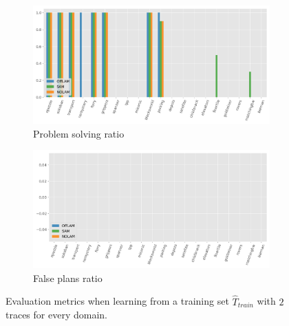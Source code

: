 \begin{figure}[ht]
  \begin{subfigure}[b]{0.45\textwidth}
    \includegraphics[width=\textwidth]{figures/2_traces/solving.png}
    \caption{Problem solving ratio}
  \end{subfigure}
  \hfill
  \begin{subfigure}[b]{0.45\textwidth}
    \includegraphics[width=\textwidth]{figures/2_traces/false_plans.png}
    \caption{False plans ratio}
  \end{subfigure}

  \caption{Evaluation metrics when learning from a training set $\hat{T}_{train}$ with $2$ traces for every domain.}
\end{figure} 